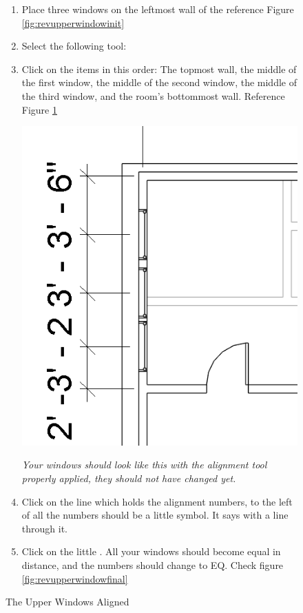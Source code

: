 \documentclass{tufte-book} %
\begin{document}
\begin{figure}
\begin{enumerate}
		\item Place three windows on the leftmost wall of the  reference Figure \ref{fig:revupperwindowinit}
		\item Select the following tool: 
		\item Click on the items in this order: The topmost wall, the middle of the first window, the middle of the second window, the middle of the third window, and the room's bottommost wall. Reference Figure \ref{fig:revupperwindowaligned}
		
		\begin{marginfigure}
			\includegraphics[width=\linewidth]{revitupperwindowaligned.png}
			\caption{The Upper Windows Aligned}
			\emph{Your windows should look like this with the alignment tool properly applied, they should not have changed yet.}
			\label{fig:revupperwindowaligned}
		\end{marginfigure}
		
		\item Click on the line which holds the alignment numbers, to the left of all the numbers should be a little symbol. It says  with a line through it.
		\item Click on the little . All your windows should become equal in distance, and the numbers should change to EQ. Check figure \ref{fig:revupperwindowfinal}
		

\end{enumerate}
\end{figure}
\end{document}
